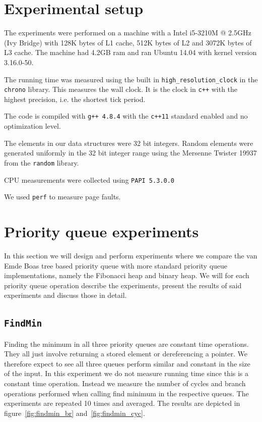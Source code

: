 \documentclass[a4paper,oneside,article,11pt]{memoir}
\begin{document}
\chapter{Experimental setup}
\label{chtp:experiment_setup}

The experiments were performed on a machine with a Intel i5-3210M @ 2.5GHz (Ivy Bridge) with 128K bytes of L1 cache, 512K bytes of L2 and 3072K bytes of L3 cache. The machine had 4.2GB ram and ran Ubuntu 14.04 with kernel version 3.16.0-50.

The running time was measured using the built in \texttt{high\_resolution\_clock} in the \texttt{chrono} library. This measures the wall clock. It is the clock in \texttt{c++} with the highest precision, i.e. the shortest tick period.

The code is compiled with \texttt{g++ 4.8.4} with the \texttt{c++11} standard enabled and no optimization level.

The elements in our data structures were 32 bit integers. Random elements were generated uniformly in the 32 bit integer range using the Mersenne Twister 19937 from the \texttt{random} library.

CPU measurements were collected using \texttt{PAPI 5.3.0.0}

We used \texttt{perf} to measure page faults.

\chapter{Priority queue experiments}
\label{heap_experiments}
In this section we will design and perform experiments where we compare the van Emde Boas tree based priority queue with more standard priority queue implementations, namely the Fibonacci heap and binary heap. We will for each priority queue operation describe the experiments, present the results of said experiments and discuss those in detail.

\section{\texttt{FindMin}}
Finding the minimum in all three priority queues are constant time operations. They all just involve returning a stored element or dereferencing a pointer. We therefore expect to see all three queues perform similar and constant in the size of the input. In this experiment we do not measure running time since this is a constant time operation. Instead we measure the number of cycles and branch operations performed when calling find minimum in the respective queues. The experiments are repeated 10 times and averaged. The results are depicted in figure~\ref{fig:findmin_br} and~\ref{fig:findmin_cyc}.
\end{document}
